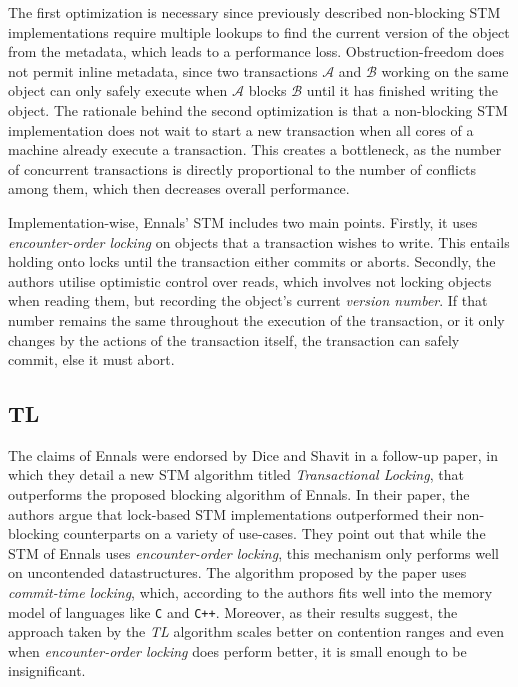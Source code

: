 The first optimization is necessary since previously described non-blocking STM implementations\cite{OSTM, DSTM} require multiple lookups to find the current version of the object from the metadata, which leads to a performance loss. Obstruction-freedom does not permit inline metadata, since two transactions $\mathcal{A}$ and $\mathcal{B}$ working on the same object can only safely execute when $\mathcal{A}$ blocks $\mathcal{B}$ until it has finished writing the object\cite{ennals-stm}. The rationale behind the second optimization is that a non-blocking STM implementation does not wait to start a new transaction when all cores of a machine already execute a transaction. This creates a bottleneck, as the number of concurrent transactions is directly proportional to the number of conflicts among them, which then decreases overall performance\cite{ennals-stm}.\par

Implementation-wise, Ennals' STM includes two main points. Firstly, it uses \textit{encounter-order locking} on objects that a transaction wishes to write. This entails holding onto locks until the transaction either commits or aborts\cite{ennals-stm}. Secondly, the authors utilise optimistic control over reads, which involves not locking objects when reading them, but recording the object's current \textit{version number}. If that number remains the same throughout the execution of the transaction, or it only changes by the actions of the transaction itself, the transaction can safely commit, else it must abort.

\subsection{TL}
The claims of Ennals were endorsed by Dice and Shavit in a follow-up paper, in which they detail a new STM algorithm titled \textit{Transactional Locking}\cite{tl}, that outperforms the proposed blocking algorithm of Ennals\cite{ennals-stm}. In their paper, the authors argue that lock-based STM implementations outperformed their non-blocking counterparts on a variety of use-cases\cite{tl}. They point out that while the STM of Ennals\cite{ennals-stm} uses \textit{encounter-order locking}, this mechanism only performs well on uncontended datastructures. The algorithm proposed by the paper\cite{tl} uses \textit{commit-time locking}, which, according to the authors fits well into the memory model of languages like \texttt{C} and \texttt{C++}\cite{tl}. Moreover, as their results suggest, the approach taken by the \textit{TL} algorithm scales better on contention ranges and even when \textit{encounter-order locking} does perform better, it is small enough to be insignificant\cite{tl}.\par

